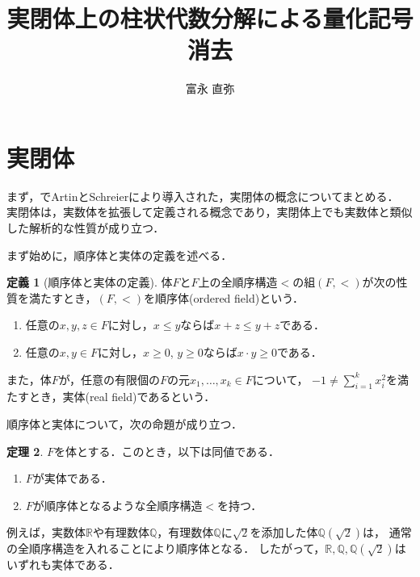 \documentclass[uplatex, dvipdfmx]{jsarticle}
\numberwithin{equation}{section}
\newcommand{\R}{\mathbb{R}}
\newcommand{\Q}{\mathbb{Q}}
\theoremstyle{definition}
\newtheorem{definition}{定義}[section]
\newtheorem{theorem}[definition]{定理}
\begin{document}
\title{実閉体上の柱状代数分解による量化記号消去}
\author{富永 直弥}
\maketitle

\section{実閉体}

まず，\cite{MR3069467}でArtinとSchreierにより導入された，実閉体の概念についてまとめる．
実閉体は，実数体を拡張して定義される概念であり，実閉体上でも実数体と類似した解析的な性質が成り立つ．

まず始めに，順序体と実体の定義を述べる．

\begin{definition}[順序体と実体の定義]
     体$F$と$F$上の全順序構造$<$の組$(F,<)$が次の性質を満たすとき，$(F,<)$を順序体(ordered field)という．
     \begin{enumerate}
          \item 任意の$x,y,z\in F$に対し，$x \leq y$ならば$x + z \leq y + z$である．
          \item 任意の$x,y \in F$に対し，$x \geq 0$, $y \geq 0$ならば$x \cdot y \geq 0$である．
     \end{enumerate}

     また，体$F$が，任意の有限個の$F$の元$x_1, \dots, x_k \in F$について，
     $-1 \neq \sum_{i=1}^k x_i^2$を満たすとき，実体(real field)であるという．
\end{definition}

順序体と実体について，次の命題が成り立つ．

\begin{theorem}
     $F$を体とする．このとき，以下は同値である．
     \begin{enumerate}
          \item $F$が実体である．
          \item $F$が順序体となるような全順序構造$<$を持つ．
     \end{enumerate}
\end{theorem}


\todo[inline]{$\Q(\sqrt{2})$を$\Q\left(\sqrt{2}\right)$に修正．以下同様．}
例えば，実数体$\R$や有理数体$\Q$，有理数体$\Q$に$\sqrt{2}$を添加した体$\Q\left(\sqrt{2}\right)$は，
通常の全順序構造を入れることにより順序体となる．
したがって，$\R, \Q, \Q\left(\sqrt{2}\right)$はいずれも実体である．
\end{document}
